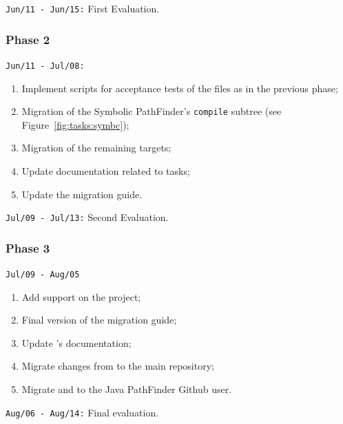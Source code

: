 \documentclass{article}
\begin{document}
\noindent\texttt{Jun/11 - Jun/15:} First Evaluation.

\subsubsection*{Phase 2}
\noindent\texttt{Jun/11 - Jul/08:}

\begin{enumerate}
\item Implement scripts for acceptance tests of the \jpfsymbc{} \jar{} files as
      in the previous phase;
\item Migration of the Symbolic PathFinder's \texttt{compile} subtree (see
      Figure~\ref{fig:tasks:symbc});
\item Migration of the remaining \ant{} targets;
\item Update documentation related to \ant{} tasks;
\item Update the migration guide.
\end{enumerate}

\noindent\texttt{Jul/09 - Jul/13:} Second Evaluation.

\subsubsection*{Phase 3}
\noindent\texttt{Jul/09 - Aug/05}

\begin{enumerate}
\item Add \gradle{} support on the \jpftemplate{} project;
\item Final version of the migration guide;
\item Update \jpftemplate's documentation;
\item Migrate changes from \jpfcore{} to the main repository;
\item Migrate \jpfsymbc{} and \jpftemplate{} to the Java PathFinder Github user.
\end{enumerate}

\noindent\texttt{Aug/06 - Aug/14:} Final evaluation.

\appendix
\end{document}
